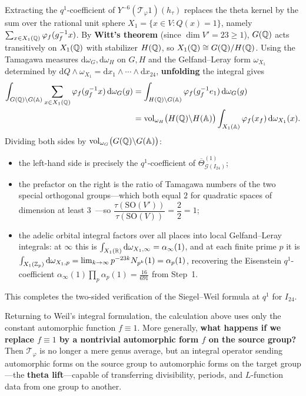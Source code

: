 Extracting the $q^1$-coefficient of $Y^{-6}(\mathcal T_\varphi 1)(h_\tau)$ replaces the theta kernel by the sum over the rational unit sphere $X_1=\{x\in V:Q(x)=1\}$, namely $\sum_{x\in X_1(\mathbb{Q})}\varphi_f(g_f^{-1}x)$. By \textbf{Witt's theorem} (since $\dim V'=23\ge 1$), $G(\mathbb{Q})$ acts transitively on $X_1(\mathbb{Q})$ with stabilizer $H(\mathbb{Q})$, so $X_1(\mathbb{Q})\cong G(\mathbb{Q})/H(\mathbb{Q})$. Using the Tamagawa measures $\mathrm d\omega_G,\mathrm d\omega_H$ on $G,H$ and the Gelfand--Leray form $\omega_{X_1}$ determined by $\mathrm dQ\wedge\omega_{X_1}=\mathrm dx_1\wedge\cdots\wedge\mathrm dx_{24}$, \textbf{unfolding} the integral gives
\[
\begin{aligned}
\int_{G(\mathbb{Q})\backslash G(\mathbb{A})}\sum_{x\in X_1(\mathbb{Q})}\varphi_f(g_f^{-1}x)\,\mathrm d\omega_G(g)
&=\int_{H(\mathbb{Q})\backslash G(\mathbb{A})}\varphi_f(g_f^{-1}e_1)\,\mathrm d\omega_G(g)\\
&=\operatorname{vol}_{\omega_H}\bigl(H(\mathbb{Q})\backslash H(\mathbb{A})\bigr)
  \int_{X_1(\mathbb{A})}\varphi_f(x_f)\,\mathrm d\omega_{X_1}(x).
\end{aligned}
\]
Dividing both sides by $\operatorname{vol}_{\omega_G}\bigl(G(\mathbb{Q})\backslash G(\mathbb{A})\bigr)$:
\begin{itemize}
\item the left-hand side is precisely the $q^1$-coefficient of $\overline{\Theta}_{\mathcal G(I_{24})}^{(1)}$;
\item the prefactor on the right is the ratio of Tamagawa numbers of the two special orthogonal groups---which both equal $2$ for quadratic spaces of dimension at least $3$~\cite{Weil1982}---so $\dfrac{\tau(\mathrm{SO}(V'))}{\tau(\mathrm{SO}(V))}=\dfrac{2}{2}=1$;
\item the adelic orbital integral factors over all places into local Gelfand--Leray integrals: at $\infty$ this is $\int_{X_1(\mathbb{R})}\mathrm d\omega_{X_1,\infty}=\alpha_\infty(1)$, and at each finite prime $p$ it is $\int_{X_1(\mathbb{Z}_p)}\mathrm d\omega_{X_1,p}=\lim_{k\to\infty}p^{-23k}N_{p^k}(1)=\alpha_p(1)$, recovering the Eisenstein $q^1$-coefficient $\alpha_\infty(1)\prod_p\alpha_p(1)=\frac{16}{691}$ from Step~1.
\end{itemize}
This completes the two-sided verification of the Siegel--Weil formula at $q^1$ for $I_{24}$.

Returning to Weil's integral formulation, the calculation above uses only the constant automorphic function $f\equiv 1$. More generally, \textbf{what happens if we replace $f\equiv 1$ by a nontrivial automorphic form $f$ on the source group?} Then $\mathcal T_\varphi$ is no longer a mere genus average, but an integral operator sending automorphic forms on the source group to automorphic forms on the target group---the \textbf{theta lift}---capable of transferring divisibility, periods, and $L$-function data from one group to another.

